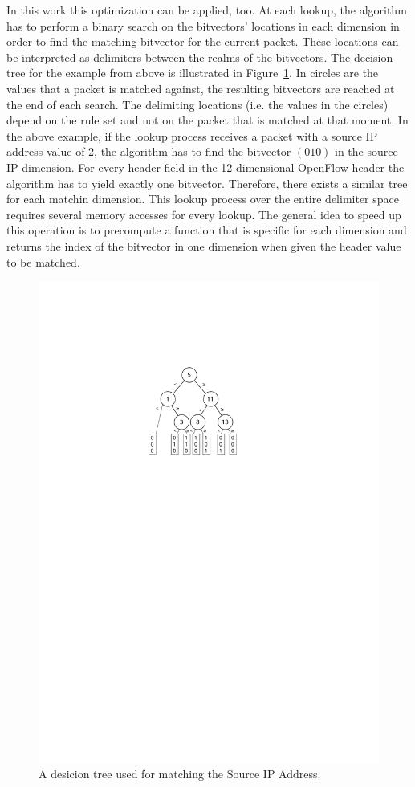 \documentclass[a4paper,
		12pt,
		parskip=full,
		titlepage
		]{scrartcl}
\begin{document}
In this work this optimization can be applied, too.
At each lookup, the algorithm has to perform a binary search on the bitvectors' 
locations in each dimension in order to find the matching bitvector for the current packet.
These locations can be interpreted as delimiters between the realms of the bitvectors.
The decision tree for the example from above is illustrated in Figure~\ref{fig:bv-tree}.
In circles are the values that a packet is matched against, the resulting bitvectors are reached at the end of each search. 
The delimiting locations (i.e. the values in the circles) depend on the 
rule set and not on the packet that is matched at that moment.
In the above example, if the lookup process receives a packet with a source IP 
address value of 2, the algorithm has to find the bitvector $(0 1 0)$ in the source IP dimension.
For every header field in the 12-dimensional OpenFlow header the algorithm has to yield exactly one bitvector.
Therefore, there exists a similar tree for each matchin dimension.
This lookup process over the entire delimiter space requires several memory accesses for every lookup.
The general idea to speed up this operation is to precompute a function that 
is specific for each dimension and returns the index of the bitvector in one 
dimension when given the header value to be matched.

\begin{figure}
\centering
\includegraphics[height=0.25\textheight]{images/bv-tree}
\caption{A desicion tree used for matching the Source IP Address.}
\label{fig:bv-tree}
\end{figure}
\end{document}
